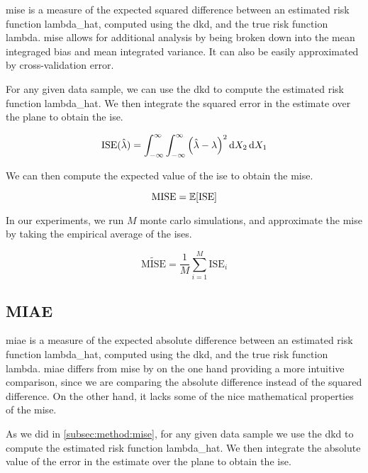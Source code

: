 \Gls{mise} is a measure of the expected squared difference between an estimated risk function \gls{lambda_hat},
computed using the \gls{dkd}, and the true risk function \gls{lambda}.
\Gls{mise} allows for additional analysis by being broken down into the mean integraged bias and mean integrated variance.
It can also be easily approximated by cross-validation error.

For any given data sample, we can use the \gls{dkd} to compute the estimated risk function \gls{lambda_hat}.
We then integrate the squared error in the estimate over the plane to obtain the \gls{ise}.

\begin{equation}
    \mbox{ISE}(\hat{\lambda}) = \int_{-\infty}^{\infty} \int_{-\infty}^{\infty} \left( \hat{\lambda} - \lambda \right)^2 \mathop{}\!\mathrm{d}{X_2} \mathop{}\!\mathrm{d}{X_1}
\end{equation}

We can then compute the expected value of the \gls{ise} to obtain the \gls{mise}.

\begin{equation}
    \mbox{MISE} = \mathbb{E} [\mbox{ISE}]
\end{equation}

In our experiments, we run \(M\) monte carlo simulations, and approximate the \gls{mise} by taking the empirical average of the \glspl{ise}.

\begin{equation}
    \widetilde{\mbox{MISE}} = \frac{1}{M} \sum_{i=1}^{M} \mbox{ISE}_i
\end{equation}

\subsection{MIAE}
\label{subsec:method:miae}

\Gls{miae} is a measure of the expected absolute difference between an estimated risk function \gls{lambda_hat},
computed using the \gls{dkd}, and the true risk function \gls{lambda}.
\Gls{miae} differs from \gls{mise} by on the one hand providing a more intuitive comparison,
since we are comparing the absolute difference instead of the squared difference.
On the other hand, it lacks some of the nice mathematical properties of the \gls{mise}.

As we did in \autoref{subsec:method:mise}, for any given data sample we use the \gls{dkd} to compute the estimated risk function \gls{lambda_hat}.
We then integrate the absolute value of the error in the estimate over the plane to obtain the \gls{ise}.

